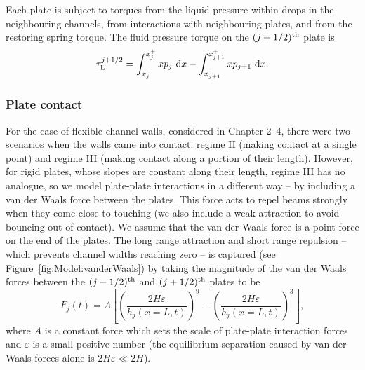 Each plate is subject to torques from the liquid pressure within drops in the neighbouring channels, from interactions with neighbouring plates, and from the restoring spring torque. The fluid pressure torque on the $(j+1/2)^{\text{th}}$ plate is
\begin{equation}\label{E:Model:Modelling:LaplaceTorque}
\tau_{\text{L}}^{j+1/2} = \int^{x_{j}^{+}}_{x_{j}^{-}} x p_{j}~\mathrm{d}x -  \int^{x_{j+1}^{+}}_{x_{j+1}^{-}} x p_{j+1}~\mathrm{d}x.
\end{equation}
\subsubsection{Plate contact}
For the case of flexible channel walls, considered in Chapter 2--4, there were two scenarios when the walls came into contact: regime II (making contact at a single point) and regime III (making contact along a portion of their length). However, for rigid plates, whose slopes are constant along their length, regime III has no analogue, so we model plate-plate interactions in a different way -- by including a van der Waals force between the plates. This force acts to repel beams strongly when they come close to touching (we also include a weak attraction to avoid bouncing out of contact). We assume that the van der Waals force is a point force on the end of the plates. The long range attraction and short range repulsion -- which prevents channel widths reaching zero -- is captured (see Figure~\ref{fig:Model:vanderWaals}) by taking the magnitude of the van der Waals forces between the $(j-1/2)^{\text{th}}$ and $(j+1/2)^{\text{th}}$ plates to be
\begin{equation}\label{E:Model:Modelling:vdwForce}
F_{j}(t) = A\left[\left(\frac{2H \varepsilon}{h_j(x = L,t)}\right)^9 - \left(\frac{2H\varepsilon }{h_j(x = L,t)}\right)^3\right],
\end{equation}
where $A$ is a constant force which sets the scale of plate-plate interaction forces and $\varepsilon$ is a small positive number (the equilibrium separation caused by van der Waals forces alone is $2H \varepsilon \ll 2H$).

